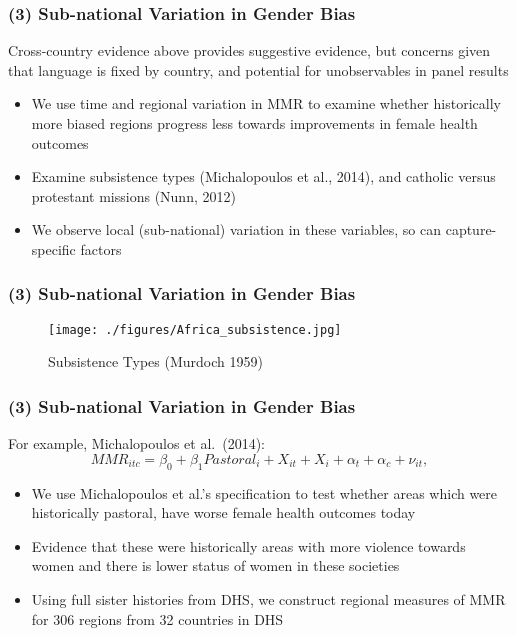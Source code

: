 \documentclass[10pt,letterpaper,subeqn]{beamer}
\begin{document}
\begin{frame}[plain]

\end{frame}


\begin{frame}
\frametitle{(3) Sub-national Variation in Gender Bias}
Cross-country evidence above provides suggestive evidence, but concerns given
that language is fixed by country, and potential for unobservables in panel 
results
\vspace{5mm}
\begin{itemize}
  \item We use time and regional variation in MMR to examine whether historically
        more biased regions progress less towards improvements in female health
        outcomes
  \item Examine subsistence types (Michalopoulos et al., 2014), and catholic
        versus protestant missions (Nunn, 2012)
  \item We observe local (sub-national) variation in these variables, so can
        capture-specific factors
\end{itemize}
\end{frame}

\begin{frame}
\frametitle{(3) Sub-national Variation in Gender Bias}
\begin{figure}
\texttt{[image: ./figures/Africa\_subsistence.jpg]}
\caption{Subsistence Types (Murdoch 1959)}
\end{figure}
\end{frame}

\begin{frame}
\frametitle{(3) Sub-national Variation in Gender Bias}
For example, Michalopoulos et al.\ (2014):
\vspace{2mm}
\begin{equation}
\label{eqn:SubType}
MMR_{itc} = \beta_0 + \beta_1 Pastoral_i + X_{it} + X_i + \alpha_t + \alpha_c + \nu_{it},
\end{equation}
\begin{itemize}
\item We use Michalopoulos et al.'s specification to test whether areas which
      were historically pastoral, have worse female health outcomes today
\item Evidence that these were historically areas with more violence towards
      women and there is lower status of women in these societies
\item Using full sister histories from DHS, we construct regional measures
      of MMR for 306 regions from 32 countries in DHS
\end{itemize}
\end{frame}
\end{document}

